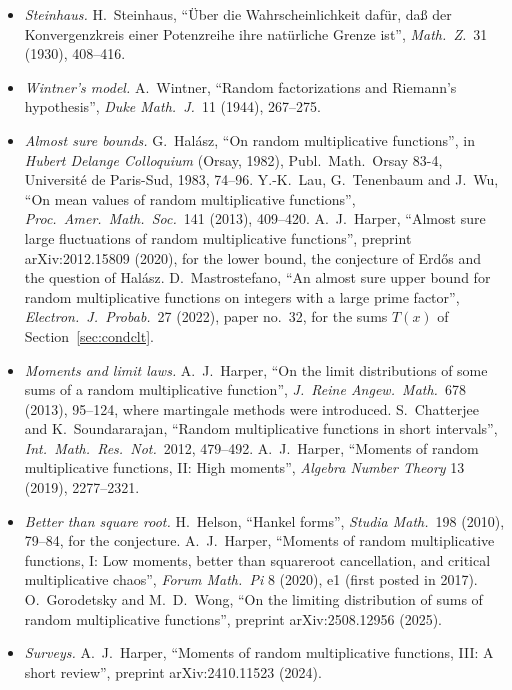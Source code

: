 \begin{itemize}
\item \emph{Steinhaus.} H.~Steinhaus, ``Über die Wahrscheinlichkeit dafür, daß der Konvergenzkreis einer Potenzreihe ihre natürliche Grenze ist'', \emph{Math.\ Z.}\ 31 (1930), 408--416.
\item \emph{Wintner's model.} A.~Wintner, ``Random factorizations and Riemann's hypothesis'', \emph{Duke Math.\ J.}\ 11 (1944), 267--275.
\item \emph{Almost sure bounds.} G.~Halász, ``On random multiplicative functions'', in \emph{Hubert Delange Colloquium} (Orsay, 1982), Publ.\ Math.\ Orsay 83-4, Université de Paris-Sud, 1983, 74--96. Y.-K.~Lau, G.~Tenenbaum and J.~Wu, ``On mean values of random multiplicative functions'', \emph{Proc.\ Amer.\ Math.\ Soc.}\ 141 (2013), 409--420. A.~J.~Harper, ``Almost sure large fluctuations of random multiplicative functions'', preprint arXiv:2012.15809 (2020), for the lower bound, the conjecture of Erd\H{o}s and the question of Halász. D.~Mastrostefano, ``An almost sure upper bound for random multiplicative functions on integers with a large prime factor'', \emph{Electron.\ J.\ Probab.}\ 27 (2022), paper no.~32, for the sums $T(x)$ of Section~\ref{sec:condclt}.
\item \emph{Moments and limit laws.} A.~J.~Harper, ``On the limit distributions of some sums of a random multiplicative function'', \emph{J.\ Reine Angew.\ Math.}\ 678 (2013), 95--124, where martingale methods were introduced. S.~Chatterjee and K.~Soundararajan, ``Random multiplicative functions in short intervals'', \emph{Int.\ Math.\ Res.\ Not.}\ 2012, 479--492. A.~J.~Harper, ``Moments of random multiplicative functions, II: High moments'', \emph{Algebra Number Theory} 13 (2019), 2277--2321.
\item \emph{Better than square root.} H.~Helson, ``Hankel forms'', \emph{Studia Math.}\ 198 (2010), 79--84, for the conjecture. A.~J.~Harper, ``Moments of random multiplicative functions, I: Low moments, better than squareroot cancellation, and critical multiplicative chaos'', \emph{Forum Math.\ Pi} 8 (2020), e1 (first posted in 2017). O.~Gorodetsky and M.~D.~Wong, ``On the limiting distribution of sums of random multiplicative functions'', preprint arXiv:2508.12956 (2025).
\item \emph{Surveys.} A.~J.~Harper, ``Moments of random multiplicative functions, III: A short review'', preprint arXiv:2410.11523 (2024).

\end{itemize}
